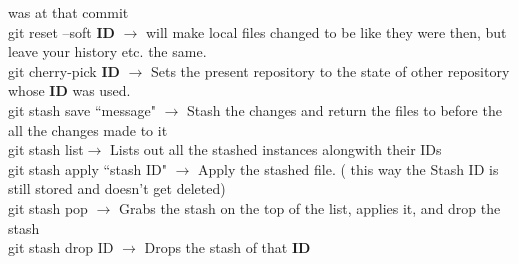 \documentclass[twoside,a4paper]{article}
\newcommand{\tcb}{\color{blue}}
\newcommand{\tcr}{\color{red}}
\newcommand{\tcg}{\color{gray}}
\newcommand{\tck}{\color{black}}
\newcommand{\ra }{$\rightarrow$ }
\begin{document}
\begin{multicols}{2}
	was at that commit\\
	\tcr git reset \tcb --soft \textbf{ID} \tck 
	\ra will make local files changed to be like they were then,
	but leave your history etc. the same.\\
	\tcr git \tcb cherry-pick \textbf{ID} \tck 
	\ra Sets the present repository to the state of other 
	repository whose \textbf{ID} was used.\\
	\tcr git stash \tcb save ``message"\tck 
	\ra Stash the changes and return the files to before the all 
	the changes made to it\\
	\tcr git stash \tcb list\tck $\rightarrow$
	Lists out all the stashed instances alongwith their IDs\\
	\tcr git stash apply \tcb ``stash ID" \tck 
	\ra Apply the stashed file. \tcg  ( this way the 
	Stash ID is still stored and doesn't get deleted)\\
	\tcr git stash \tcb pop \tck \ra Grabs
	the stash on the top of the list, applies it, and drop the stash\\
	\tcr git stash \tcb drop ID \tck \ra 
	Drops the stash of that \textbf{ID}\\

\vfill \null
\newpage

\end{multicols}

	\newpage
\end{document}
